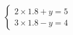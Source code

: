 \documentclass[preview]{standalone}
\begin{document}
\begin{align*}
\begin{cases} 2\times1.8 + y = 5 \\ 3\times1.8 - y = 4 \end{cases}
\end{align*}
\end{document}
